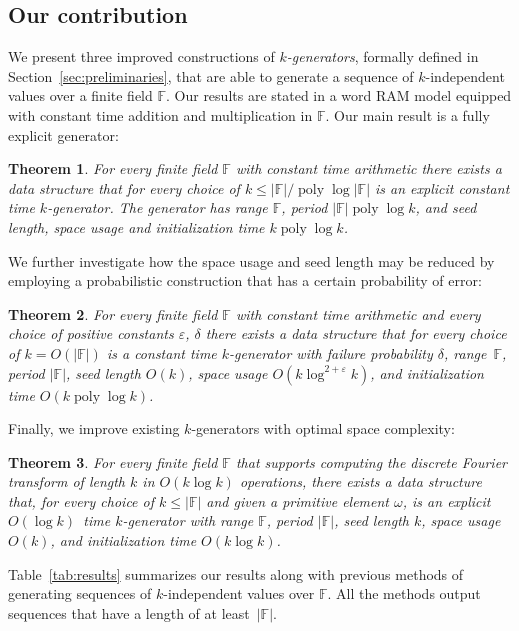 \documentclass[a4paper,11pt]{article}
\theoremstyle{plain}
\newtheorem{theorem}{Theorem}
\theoremstyle{definition}
\newcommand{\F}{\mathbb{F}}
\DeclareMathOperator{\poly}{poly}
\begin{document}
\subsection{Our contribution}
We present three improved constructions of \emph{$k$-generators}, formally defined in Section~\ref{sec:preliminaries}, that are able to generate a sequence of $k$-independent values over a finite field $\F$.
Our results are stated in a word RAM model equipped with constant time addition and multiplication in $\F$.     
Our main result is a fully explicit generator:
\begin{theorem}\label{thm:explicit}
For every finite field $\F$ with constant time arithmetic there exists a data structure that for every choice of $k \leq |\F| /\! \poly \log |\F|$ is an explicit constant time $k$-generator.
The generator has range $\F$, period $|\F|\poly \log k$, and seed length, space usage and initialization time $k \poly \log k$.
\end{theorem}
We further investigate how the space usage and seed length may be reduced by employing a probabilistic construction that has a certain probability of error:
\begin{theorem} \label{thm:existence}
For every finite field $\F$ with constant time arithmetic and every choice of positive constants $\varepsilon$, $\delta$ there exists a data structure 
that for every choice of $k = O(|\F|)$ is a constant time $k$-generator with failure probability $\delta$,
range~$\F$, period $|\F|$, seed length $O(k)$, space usage $O(k \log^{2+\varepsilon}k)$, and initialization time $O(k \poly \log k)$.
\end{theorem}
Finally, we improve existing $k$-generators with optimal space complexity:
\begin{theorem} \label{thm:fastmultipoint}
For every finite field $\F$ that supports computing the discrete Fourier transform of length $k$ in $O(k \log k)$ operations, 
there exists a data structure that, for every choice of $k \leq |\F|$ and given a primitive element $\omega$, 
is an explicit $O(\log k)$~time $k$-generator with range $\F$, period $|\F|$, seed length $k$, space usage $O(k)$, and initialization time $O(k \log k)$.
\end{theorem}

Table~\ref{tab:results} summarizes our results along with previous methods of generating sequences of $k$-independent values over $\F$. 
All the methods output sequences that have a length of at least~$|\F|$.
\end{document}
